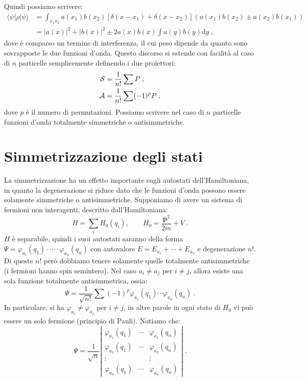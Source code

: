 \documentclass[12pt,a4paper]{report}
\theoremstyle{definition}
\numberwithin{equation}{section}
\newcommand{\diff}[1][]{\mathrm{d}#1}
\newcommand{\bra}{\langle}
\newcommand{\ket}{\rangle}
\begin{document}
Quindi possiamo scrivere:
\begin{align}
\bra \psi|\rho|\psi\ket &= \int_{x_1x_2}a(x_1)b(x_2)[\delta(x-x_1)+\delta(x-x_2)](a(x_1)b(x_2)\pm a(x_2)b(x_1)) \\
&= |a(x)|^2+|b(x)|^2\pm 2a(x)b(x)\int a(y)b(y)\diff{y}\;,
\end{align}
dove è comparso un termine di interferenza, il cui peso dipende da quanto sono sovrapposte le due funzioni d'onda. Questo discorso si estende con facilità al caso di $n$ particelle semplicemente definendo i due proiettori:
\begin{align}
\mathcal{S} &= \frac{1}{n!}\sum P\;, \\ \notag 
\mathcal{A} &= \frac{1}{n!}\sum (-1)^pP\;,
\end{align}
dove $p$ è il numero di permutazioni. Possiamo scrivere nel caso di $n$ particelle funzioni d'onda totalmente simmetriche o antisimmetriche.
\section{Simmetrizzazione degli stati}
La simmetrizzazione ha un effetto importante sugli autostati dell'Hamiltoniana, in quanto la degenerazione si riduce dato che le funzioni d'onda possono essere solamente simmetriche o antisimmetriche. Supponiamo di avere un sistema di fermioni non interagenti, descritto dall'Hamiltoniana:
\begin{equation}
H=\sum_i H_0(q_i),\qquad H_0=\frac{\mathbf{p}^2}{2m}+V\;.
\end{equation}
$H$ è separabile, quindi i suoi autostati saranno della forma $\Psi=\varphi_{a_1}(q_1)\cdot\cdots\cdot\varphi_{a_n}(q_n)$ con autovalore $E=E_{a_1}+\cdots+E_{a_n}$ e degenerazione $n!$. Di queste $n!$ però dobbiamo tenere solamente quelle totalmente antisimmetriche (i fermioni hanno spin semintero). Nel caso $a_i\ne a_j$ per $i\ne j$, allora esiste una sola funzione totalmente antisimmetrica, ossia:
\begin{equation}
\Psi=\frac{1}{\sqrt{n!}}\sum (-1)^p\varphi_{a_1}(q_1)\cdots\varphi_{a_n}(q_n)\;.
\end{equation}
In particolare, si ha $\varphi_{a_i}\ne\varphi_{a_j}$ per $i\ne j$, in altre parole in ogni stato di $H_0$ vi può essere un solo fermione (principio di Pauli). Notiamo che:
\begin{equation}
\Psi=\frac{1}{\sqrt{n}}\left|\begin{matrix}
\varphi_{a_1}(q_1) & \cdots & \varphi_{a_1}(q_n) \\
\varphi_{a_2}(q_1) & \cdots & \varphi_{a_2}(q_n) \\
\vdots & {} & \vdots \\
\varphi_{a_n}(q_1) & \cdots & \varphi_{a_n}(q_n)
\end{matrix}\right|\;.
\end{equation}
\end{document}
